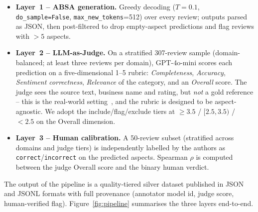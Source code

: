 \documentclass[runningheads]{llncs}
\begin{document}
\begin{itemize}
\item \textbf{Layer~1 -- ABSA generation.} Greedy decoding ($T=0.1$,
\texttt{do\_sample=False}, \texttt{max\_new\_tokens}=512) over every
review; outputs parsed as JSON, then post-filtered to drop empty-aspect
predictions and flag reviews with $>5$ aspects.
\item \textbf{Layer~2 -- LLM-as-Judge.} On a stratified 307-review sample
(domain-balanced; at least three reviews per domain), GPT-4o-mini scores
each prediction on a five-dimensional 1--5 rubric: \emph{Completeness},
\emph{Accuracy}, \emph{Sentiment correctness}, \emph{Relevance} of the
category, and an \emph{Overall} score. The judge sees the source text,
business name and rating, but \emph{not} a gold reference -- this is the
real-world setting~\cite{10.5555/3666122.3668142}, and the rubric is
designed to be aspect-agnostic. We adopt the
include/flag/exclude tiers at $\geq 3.5$ / $[2.5, 3.5)$ / $< 2.5$ on the
Overall dimension.
\item \textbf{Layer~3 -- Human calibration.} A 50-review subset
(stratified across domains and judge tiers) is independently labelled by
the authors as \texttt{correct}/\texttt{incorrect} on the predicted
aspects. Spearman $\rho$ is computed between the judge Overall score and
the binary human verdict.
\end{itemize}

The output of the pipeline is a quality-tiered silver dataset published
in JSON and JSONL formats with full provenance (annotator model id, judge
score, human-verified flag). Figure~\ref{fig:pipeline} summarises the
three layers end-to-end.
\end{document}

